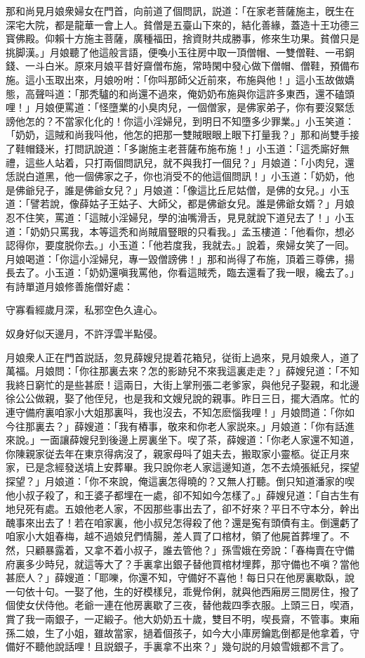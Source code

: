 那和尚見月娘衆婦女在門首，向前道了個問訊，説道：「在家老菩薩施主，旣生在深宅大院，都是龍華一會上人。貧僧是五臺山下來的，結化善緣，蓋造十王功德三寳佛殿。仰賴十方施主菩薩，廣種福田，捨資財共成勝事，修來生功果。貧僧只是挑脚漢。」月娘聽了他這般言語，便喚小玉往房中取一頂僧帽、一雙僧鞋、一弔銅錢、一斗白米。原來月娘平昔好齋僧布施，常時閑中發心做下僧帽、僧鞋，預備布施。這小玉取出來，月娘吩咐：「你呌那師父近前來，布施與他！」這小玉故做嬌態，高聲呌道：「那秃驢的和尚還不過來，俺奶奶布施與你這許多東西，還不磕頭哩！」月娘便罵道：「怪墮業的小臭肉兒，一個僧家，是佛家弟子，你有要沒緊恁謗他怎的？不當家化化的！你這小淫婦兒，到明日不知墮多少罪業。」小玉笑道：「奶奶，這賊和尚我呌他，他怎的把那一雙賊眼眼上眼下打量我？」那和尚雙手接了鞋帽錢米，打問訊說道：「多謝施主老菩薩布施布施！」小玉道：「這秃廝好無禮，這些人站着，只打兩個問訊兒，就不與我打一個兒？」月娘道：「小肉兒，還恁説白道黑，他一個佛家之子，你也消受不的他這個問訊！」小玉道：「奶奶，他是佛爺兒子，誰是佛爺女兒？」月娘道：「像這比丘尼姑僧，是佛的女兒。」小玉道：「譬若說，像薛姑子王姑子、大師父，都是佛爺女兒。誰是佛爺女婿？」月娘忍不住笑，罵道：「這賊小淫婦兒，學的油嘴滑舌，見見就說下道兒去了！」小玉道：「奶奶只罵我，本等這秃和尚賊眉豎眼的只看我。」孟玉樓道：「他看你，想必認得你，要度脱你去。」小玉道：「他若度我，我就去。」說着，衆婦女笑了一囘。月娘喝道：「你這小淫婦兒，專一毀僧謗佛！」那和尚得了布施，頂着三尊佛，揚長去了。小玉道：「奶奶還嗔我罵他，你看這賊秃，臨去還看了我一眼，纔去了。」有詩單道月娘修善施僧好處：

\begin{myquote}
守寡看經歲月深，私邪空色久違心。

奴身好似天邊月，不許浮雲半點侵。
\end{myquote}

月娘衆人正在門首説話，忽見薛嫂兒提着花箱兒，従街上過來，見月娘衆人，道了萬福。月娘問：「你往那裏去來？怎的影跡兒不來我這裏走走？」薛嫂兒道：「不知我終日窮忙的是些甚麽！這兩日，大街上掌刑張二老爹家，與他兒子娶親，和北邊徐公公做親，娶了他侄兒，也是我和文嫂兒說的親事。昨日三日，擺大酒席。忙的連守備府裏咱家小大姐那裏呌，我也沒去，不知怎麽惱我哩！」月娘問道：「你如今往那裏去？」薛嫂道：「我有樁事，敬來和你老人家説來。」月娘道：「你有話進來說。」一面讓薛嫂兒到後邊上房裏坐下。喫了茶，薛嫂道：「你老人家還不知道，你陳親家従去年在東京得病沒了，親家母呌了姐夫去，搬取家小靈柩。従正月來家，已是念經發送墳上安葬畢。我只說你老人家這邊知道，怎不去燒張紙兒，探望探望？」月娘道：「你不來說，俺這裏怎得曉的？又無人打聽。倒只知道潘家的喫他小叔子殺了，和王婆子都埋在一處，卻不知如今怎樣了。」薛嫂兒道：「自古生有地兒死有處。五娘他老人家，不因那些事出去了，卻不好來？平日不守本分，幹出醜事來出去了！若在咱家裏，他小叔兒怎得殺了他？還是寃有頭債有主。倒還虧了咱家小大姐春梅，越不過娘兒們情腸，差人買了口棺材，領了他屍首葬埋了。不然，只顧暴露着，又拿不着小叔子，誰去管他？」孫雪娥在旁說：「春梅賣在守備府裏多少時兒，就這等大了？手裏拿出銀子替他買棺材埋葬，那守備也不嗔？當他甚麽人？」薛嫂道：「耶嚛，你還不知，守備好不喜他！每日只在他房裏歇臥，說一句依十句。一娶了他，生的好模樣兒，乖覺伶俐，就與他西廂房三間房住，撥了個使女伏侍他。老爺一連在他房裏歇了三夜，替他裁四季衣服。上頭三日，喫酒，賞了我一兩銀子，一疋緞子。他大奶奶五十歲，雙目不明，喫長齋，不管事。東廂孫二娘，生了小姐，雖故當家，撾着個孩子，如今大小庫房鑰匙倒都是他拿着，守備好不聽他說話哩！且説銀子，手裏拿不出來？」幾句説的月娘雪娥都不言了。

